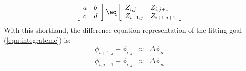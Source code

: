 \par
\begin{equation}
        \left[
                \begin{array}{ll}
                a & b \\
                c & d
                \end{array}
        \right]
        \eq
        \left[
                \begin{array}{ll}
                Z_{i,j}   & Z_{i,j+1} \\
                Z_{i+1,j} & Z_{i+1,j+1}
                \end{array}
        \right]
\end{equation}
With this shorthand, the difference equation representation of the fitting goal (\ref{eqn:integrateme}) is: 
\begin{equation}
        \begin{array}{rcl}
                \phi_{i+1,j} -\phi_{i,j} &\approx& \Delta\phi_{ac} \\
                \phi_{i,j+1} -\phi_{i,j} &\approx& \Delta\phi_{ab}
        \end{array}
\label{eqn:diffgrad}
\end{equation}

